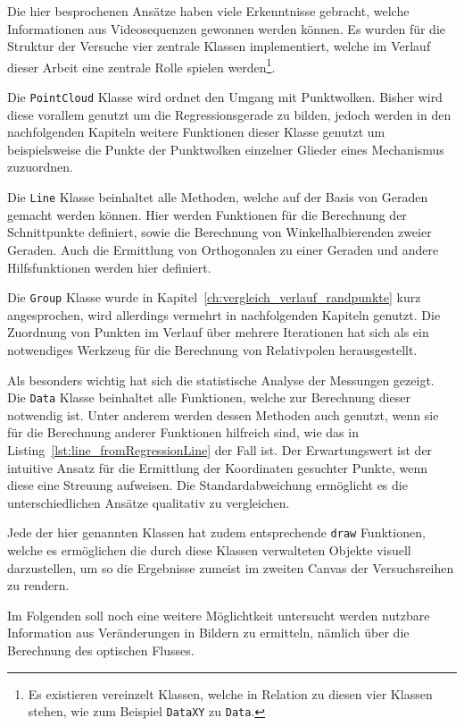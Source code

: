 Die hier besprochenen Ansätze haben viele Erkenntnisse gebracht, welche Informationen aus Videosequenzen gewonnen werden können.
Es wurden für die Struktur der Versuche vier zentrale Klassen implementiert, welche im Verlauf dieser Arbeit eine zentrale Rolle spielen werden\footnote{Es existieren vereinzelt Klassen, welche in Relation zu diesen vier Klassen stehen, wie zum Beispiel \lstinline{DataXY} zu \lstinline{Data}.}.

Die \lstinline{PointCloud} Klasse wird ordnet den Umgang mit Punktwolken.
Bisher wird diese vorallem genutzt um die Regressionsgerade zu bilden, jedoch werden in den nachfolgenden Kapiteln weitere Funktionen dieser Klasse genutzt um beispielsweise die Punkte der Punktwolken einzelner Glieder eines Mechanismus zuzuordnen.

Die \lstinline{Line} Klasse beinhaltet alle Methoden, welche auf der Basis von Geraden gemacht werden können.
Hier werden Funktionen für die Berechnung der Schnittpunkte definiert, sowie die Berechnung von Winkelhalbierenden zweier Geraden.
Auch die Ermittlung von Orthogonalen zu einer Geraden und andere Hilfsfunktionen werden hier definiert.

Die \lstinline{Group} Klasse wurde in Kapitel~\ref{ch:vergleich_verlauf_randpunkte} kurz angesprochen, wird allerdings vermehrt in nachfolgenden Kapiteln genutzt.
Die Zuordnung von Punkten im Verlauf über mehrere Iterationen hat sich als ein notwendiges Werkzeug für die Berechnung von Relativpolen herausgestellt.

Als besonders wichtig hat sich die statistische Analyse der Messungen gezeigt.
Die \lstinline{Data} Klasse beinhaltet alle Funktionen, welche zur Berechnung dieser notwendig ist.
Unter anderem werden dessen Methoden auch genutzt, wenn sie für die Berechnung anderer Funktionen hilfreich sind, wie das in Listing~\ref{lst:line_fromRegressionLine} der Fall ist.
Der Erwartungswert ist der intuitive Ansatz für die Ermittlung der Koordinaten gesuchter Punkte, wenn diese eine Streuung aufweisen.
Die Standardabweichung ermöglicht es die unterschiedlichen Ansätze qualitativ zu vergleichen.

Jede der hier genannten Klassen hat zudem entsprechende \lstinline{draw} Funktionen, welche es ermöglichen die durch diese Klassen verwalteten Objekte visuell darzustellen, um so die Ergebnisse zumeist im zweiten Canvas der Versuchsreihen zu rendern.

Im Folgenden soll noch eine weitere Möglichtkeit untersucht werden nutzbare Information aus Veränderungen in Bildern zu ermitteln, nämlich über die Berechnung des optischen Flusses.
